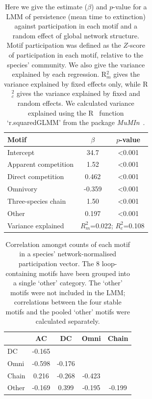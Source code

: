 \documentclass[12pt]{article}
\begin{document}
\begin{spacing}{2.0}
		\begin{table}[h!]
		\caption{Here we give the estimate ($\beta$) and $p$-value for a LMM of persistence (mean time to extinction) against participation in each motif and a random effect of global network structure.  Motif participation was defined as the $Z$-score of participation in each motif, relative to the species' community. We also give the variance explained by each regression. R$^{2}_{m}$ gives the variance explained by fixed effects only, while R$^{2}_{c}$ gives the variance explained by fixed and random effects. We calculated variance explained using the R~\citep{R} function `r.squaredGLMM' from the package \emph{MuMIn}~\citep{MuMIn}.}
		\label{tab:persistence_Z}
		\begin{tabular}{l | c c}
		 Motif & $\beta$ & $p$-value \\  
		 \hline
		 Intercept & 34.7 & \textless0.001 \\
		 \hline
		 Apparent competition & 1.52 & \textless0.001 \\
		 Direct competition &  0.462  & \textless0.001 \\
		 Omnivory & -0.359  & \textless0.001 \\
		 Three-species chain & 1.50 & \textless0.001 \\
		 Other &  0.197  & \textless0.001 \\
		 \hline
		 Variance explained & \multicolumn{2}{c}{$R^{2}_m$=0.022; $R^{2}_c$=0.108} \\
		 \hline
		 \end{tabular}
		 \end{table}


		\begin{table}[h!]
		\caption{Correlation amongst counts of each motif in a species' network-normalised participation vector. The 8 loop-containing motifs have been grouped into a single `other' category. The `other' motifs were not included in the LMM; correlations between the four stable motifs and the pooled `other' motifs were calculated separately.}
		\label{tab:Z_correlations}
		\begin{tabular}{l | c c c c}
			& AC & DC & Omni & Chain \\
		\hline
		DC     & -0.165 &        &        &    \\
		Omni   & -0.598 & -0.176 &        &     \\
		Chain  &  0.216 & -0.268 & -0.423 &      \\
		Other  & -0.169 &  0.399 & -0.195 & -0.199 \\
		\hline
		\end{tabular}
		\end{table}



\end{spacing}
\end{document}
